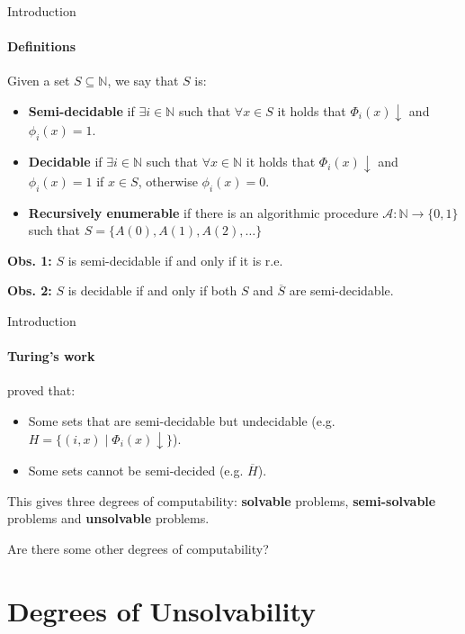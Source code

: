 \documentclass{beamer}
\newcommand{\N}{\mathbb{N}}                     %
\begin{document}
\begin{frame}{Introduction}
\framesubtitle{Definitions}
    Given a set $S \subseteq \N$, we say that $S$ is:
    \begin{itemize}[<+->]
        \item \textbf{Semi-decidable} if $\exists i \in \N$ such that $\forall x \in S$ it holds that $\Phi_i(x) \downarrow$ and $\phi_i(x) = 1$.
        \item \textbf{Decidable} if $\exists i \in \N$ such that $\forall x \in \N$ it holds that $\Phi_i(x) \downarrow$ and $\phi_i(x) = 1$ if $x \in S$, otherwise $\phi_i(x) = 0$.
        \item \textbf{Recursively enumerable} if there is an algorithmic procedure $\mathcal{A} : \N \to \{0,1\}$ such that $S = \{A(0), A(1), A(2), \ldots\}$
    \end{itemize}

    \quad

    \uncover<+-> {
        \textbf{Obs. 1:} $S$ is semi-decidable if and only if it is r.e.

        \textbf{Obs. 2:} $S$ is decidable if and only if both $S$ and $\overline{S}$ are semi-decidable.
    }
\end{frame}

\begin{frame}{Introduction}
\framesubtitle{Turing's work}
    \textcite{turing} proved that:
    \begin{itemize}[<+->]
        \item  Some sets that are semi-decidable but undecidable (e.g. $H = \{(i,x) \mid \Phi_i(x) \downarrow\}$).
        
        \item Some sets cannot be semi-decided (e.g. $\overline{H}$).
    \end{itemize}

    \uncover<+-> {
        This gives three degrees of computability: \textbf{solvable} problems, \textbf{semi-solvable} problems and \textbf{unsolvable} problems.
    }

    \quad

    \uncover<+-> {
        Are there some other degrees of computability?
    }
\end{frame}

\section{Degrees of Unsolvability}
\end{document}
